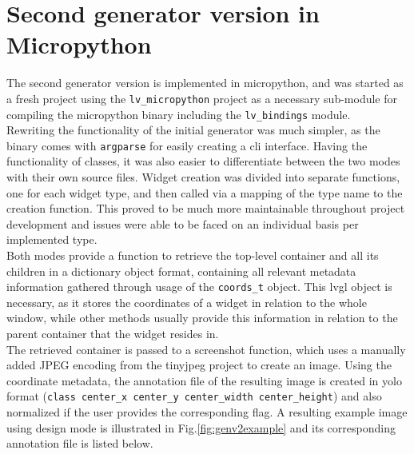 \documentclass[Bachelor, BIC, english, fhCitStyle, IEEE]{BASE/twbook} %
\def\code#1{\texttt{#1}}
\begin{document}
\section{Second generator version in Micropython}
The second generator version is implemented in micropython, and was started as a fresh project using the \code{lv\_micropython} project as a necessary sub-module for compiling the micropython binary including the \code{lv\_bindings} module.\\
Rewriting the functionality of the initial generator was much simpler, as the binary comes with \code{argparse} for easily creating a \ac{cli} interface. Having the functionality of classes, it was also easier to differentiate between the two modes with their own source files. Widget creation was divided into separate functions, one for each widget type, and then called via a mapping of the type name to the creation function. This proved to be much more maintainable throughout project development and issues were able to be faced on an individual basis per implemented type.\\
Both modes provide a function to retrieve the top-level container and all its children in a dictionary object format, containing all relevant metadata information gathered through usage of the \code{coords\_t} object. This \ac{lvgl} object is necessary, as it stores the coordinates of a widget in relation to the whole window, while other methods usually provide this information in relation to the parent container that the widget resides in.\\
The retrieved container is passed to a screenshot function, which uses a manually added JPEG encoding from the tinyjpeg project to create an image. Using the coordinate metadata, the annotation file of the resulting image is created in \ac{yolo} format (\code{class center\_x center\_y center\_width center\_height}) and also normalized if the user provides the corresponding flag.
A resulting example image using design mode is illustrated in Fig.\ref{fig:genv2example} and its corresponding annotation file is listed below.
\end{document}
